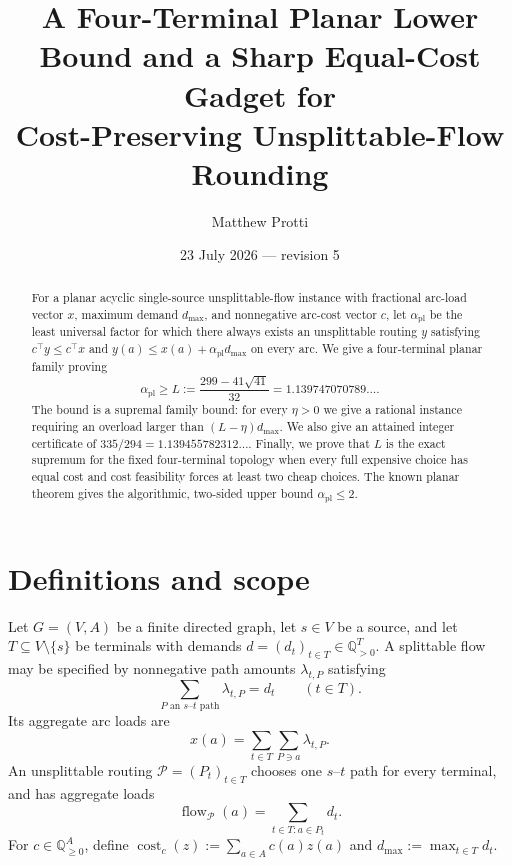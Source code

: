 \documentclass[11pt]{article}
\title{A Four-Terminal Planar Lower Bound and a Sharp Equal-Cost Gadget for\\
Cost-Preserving Unsplittable-Flow Rounding}
\author{Matthew Protti}
\date{23 July 2026 --- revision 5}
\theoremstyle{remark}
\newcommand{\Q}{\mathbb{Q}}
\newcommand{\apl}{\alpha_{\mathrm{pl}}}
\newcommand{\flow}{\operatorname{flow}}
\newcommand{\cost}{\operatorname{cost}}
\begin{document}
\maketitle

\begin{center}
\end{center}

\begin{abstract}
For a planar acyclic single-source unsplittable-flow instance with fractional
arc-load vector $x$, maximum demand $d_{\max}$, and nonnegative arc-cost
vector $c$, let $\apl$ be the least universal factor for which there always
exists an unsplittable routing $y$ satisfying
$c^\top y\le c^\top x$ and $y(a)\le x(a)+\apl d_{\max}$ on every arc.
We give a four-terminal planar family proving
\[
 \apl\ge L:=\frac{299-41\sqrt{41}}{32}
 =1.139747070789\ldots .
\]
The bound is a supremal family bound: for every $\eta>0$ we give a rational
instance requiring an overload larger than $(L-\eta)d_{\max}$.  We also give
an attained integer certificate of $335/294=1.139455782312\ldots$.  Finally,
we prove that $L$ is the exact supremum for the fixed four-terminal topology
when every full expensive choice has equal cost and cost feasibility forces
at least two cheap choices.  The known planar theorem gives the algorithmic,
two-sided upper bound $\apl\le2$.
\end{abstract}

\section{Definitions and scope}

Let $G=(V,A)$ be a finite directed graph, let $s\in V$ be a source, and let
$T\subseteq V\setminus\{s\}$ be terminals with demands
$d=(d_t)_{t\in T}\in\Q_{>0}^T$.  A splittable flow may be specified by
nonnegative path amounts $\lambda_{t,P}$ satisfying
\[
 \sum_{P\text{ an }s\text{--}t\text{ path}}\lambda_{t,P}=d_t
 \qquad(t\in T).
\]
Its aggregate arc loads are
\[
 x(a)=\sum_{t\in T}\sum_{P\ni a}\lambda_{t,P}.
\]
An unsplittable routing $\mathcal P=(P_t)_{t\in T}$ chooses one $s$--$t$
path for every terminal, and has aggregate loads
\[
 \flow_{\mathcal P}(a)=\sum_{t\in T:a\in P_t}d_t.
\]
For $c\in\Q_{\ge0}^A$, define
$\cost_c(z):=\sum_{a\in A}c(a)z(a)$ and
$d_{\max}:=\max_{t\in T}d_t$.
\end{document}
